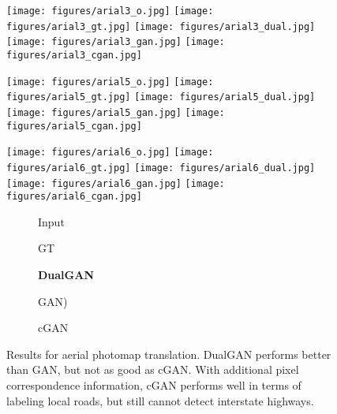 \begin{figure}
\begin{center}


\texttt{[image: figures/arial3\_o.jpg]}
\texttt{[image: figures/arial3\_gt.jpg]}
\texttt{[image: figures/arial3\_dual.jpg]}
\texttt{[image: figures/arial3\_gan.jpg]}
\texttt{[image: figures/arial3\_cgan.jpg]}



\texttt{[image: figures/arial5\_o.jpg]}
\texttt{[image: figures/arial5\_gt.jpg]}
\texttt{[image: figures/arial5\_dual.jpg]}
\texttt{[image: figures/arial5\_gan.jpg]}
\texttt{[image: figures/arial5\_cgan.jpg]}

\texttt{[image: figures/arial6\_o.jpg]}
\texttt{[image: figures/arial6\_gt.jpg]}
\texttt{[image: figures/arial6\_dual.jpg]}
\texttt{[image: figures/arial6\_gan.jpg]}
\texttt{[image: figures/arial6\_cgan.jpg]}

\begin{subfigure}[]{0.19\linewidth}\caption*{Input}\end{subfigure}
\begin{subfigure}[]{0.19\linewidth}\caption*{GT}\end{subfigure}
\begin{subfigure}[]{0.19\linewidth}\caption*{\textbf{DualGAN}}\end{subfigure}
\begin{subfigure}[]{0.19\linewidth}\caption*{GAN)}\end{subfigure}
\begin{subfigure}[]{0.19\linewidth}\caption*{cGAN~\cite{isola2016image}}\end{subfigure}
\caption{Results for aerial photomap translation. DualGAN performs better than 
GAN, but not as good as cGAN. With additional pixel correspondence information, cGAN performs 
well in terms of labeling local roads, but still cannot detect interstate highways.}
\label{fig:aerial}
\end{center}
\end{figure}


